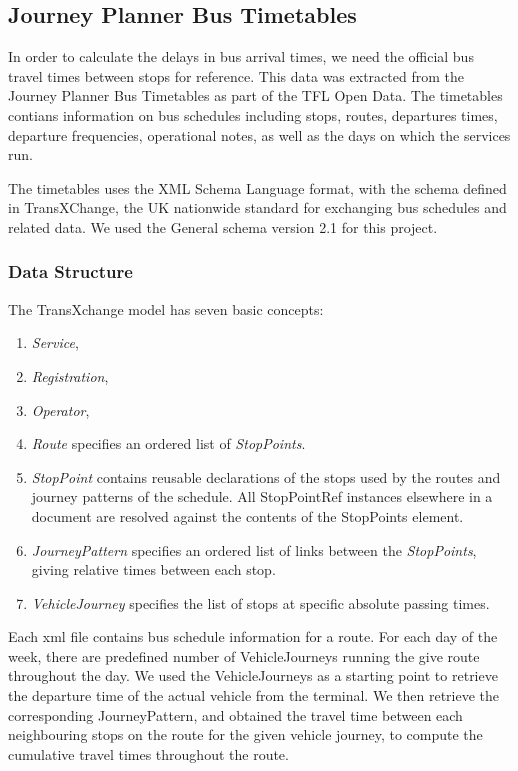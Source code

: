 \subsection{Journey Planner Bus Timetables}
In order to calculate the delays in bus arrival times, we need the official bus travel times between stops for reference. This data was extracted from the Journey Planner Bus Timetables\cite{open_data_feeds_description} as part of the TFL Open Data. The timetables contians information on bus schedules including stops, routes, departures times, departure frequencies, operational notes, as well as the days on which the services run.

The timetables uses the XML Schema Language\cite{xml} format, with the schema defined in TransXChange\cite{transxchange}, the UK nationwide standard for exchanging bus schedules and related data. We used the General schema version 2.1\cite{transxchange_downloads_and_schema}\cite{transxchange_schema_2.1_xsd} for this project.

\subsubsection{Data Structure}
The TransXchange model has seven basic concepts\cite{transxchange_schema_guide}:
\begin{enumerate}
  \item \textit{Service},
  \item \textit{Registration},
  \item \textit{Operator},
  \item \textit{Route} specifies an ordered list of \textit{StopPoints}.
  \item \textit{StopPoint} contains reusable declarations of the stops used by the routes and journey patterns of the schedule. All StopPointRef instances elsewhere in a document are resolved against the contents of the StopPoints element.
  \item \textit{JourneyPattern} specifies an ordered list of links between the \textit{StopPoints}, giving
relative times between each stop.
  \item \textit{VehicleJourney} specifies the list of stops at specific absolute passing times.
\end{enumerate}
\par Each xml file contains bus schedule information for a route. For each day of the week, there are predefined number of VehicleJourneys running the give route throughout the day. We used the VehicleJourneys as a starting point to retrieve the departure time of the actual vehicle from the terminal. We then retrieve the corresponding JourneyPattern, and obtained the travel time between each neighbouring stops on the route for the given vehicle journey, to compute the cumulative travel times throughout the route.

